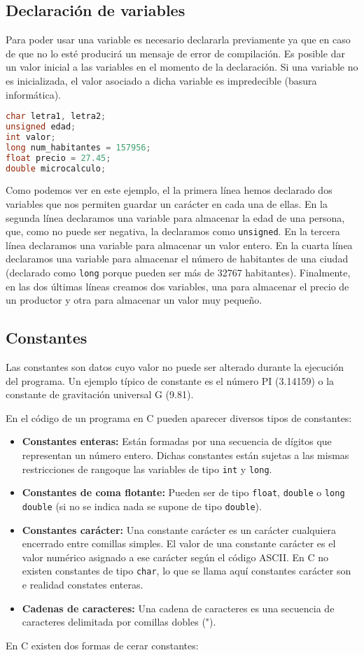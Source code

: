 \subsection{Declaración de variables}{
Para poder usar una variable es necesario declararla previamente ya que en caso de que no lo esté producirá un mensaje de error de compilación. Es posible dar un valor inicial a las variables en el momento de la declaración. Si una variable no es inicializada, el valor asociado a dicha variable es impredecible (basura informática).
\begin{Ejemplo}
\begin{lstlisting}[language=C]
char letra1, letra2;
unsigned edad;
int valor;
long num_habitantes = 157956;
float precio = 27.45;
double microcalculo;
\end{lstlisting}
\Explicacion
Como podemos ver en este ejemplo, el la primera línea hemos declarado dos variables que nos permiten guardar un carácter en cada una de ellas. En la segunda línea declaramos una variable para almacenar la edad de una persona, que, como no puede ser negativa, la declaramos como \texttt{unsigned}. En la tercera línea declaramos una variable para almacenar un valor entero. En la cuarta línea declaramos una variable para almacenar el número de habitantes de una ciudad (declarado como \texttt{long} porque pueden ser más de 32767 habitantes). Finalmente, en las dos últimas líneas creamos dos variables, una para almacenar el precio de un productor y otra para almacenar un valor muy pequeño.
\end{Ejemplo}
}
\subsection{Constantes}{
Las constantes son datos cuyo valor no puede ser alterado durante la ejecución del programa. Un ejemplo típico de constante es el número PI (3.14159) o la constante de gravitación universal G (9.81).

En el código de un programa en C pueden aparecer diversos tipos de constantes:
\begin{itemize}
	\item \textbf{Constantes enteras:} Están formadas por una secuencia de dígitos que representan un número entero. Dichas constantes están sujetas a las mismas restricciones de rangoque las variables de tipo \texttt{int} y \texttt{long}.
	\item \textbf{Constantes de coma flotante:} Pueden ser de tipo \texttt{float}, \texttt{double} o \texttt{long double} (si no se indica nada se supone de tipo \texttt{double}).
	\item \textbf{Constantes carácter:} Una constante carácter es un carácter cualquiera encerrado entre comillas simples. El valor de una constante carácter es el valor numérico asignado a ese carácter según el código ASCII. En C no existen constantes de tipo \texttt{char}, lo que se llama aquí constantes carácter son e realidad  constates enteras.
	\item \textbf{Cadenas de caracteres:} Una cadena de caracteres es una secuencia de caracteres delimitada por comillas dobles (").
\end{itemize}
En C existen dos formas de cerar constantes:
}

